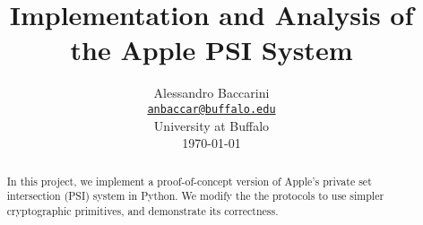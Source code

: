 \documentclass[11pt,letterpaper,oneside]{article}
\title{
Implementation and Analysis of\\ 
 the Apple PSI System \\
 \cite{bhowmick2021apple}
 }
\author{Alessandro Baccarini \\
\small{\href{mailto:anbaccar@buffalo.edu}{\texttt{anbaccar@buffalo.edu}}} \\
\small{University at Buffalo} \\ 
\small{\today} 
 \vspace{-1.5cm}
}
\date{}
\begin{document}
\maketitle


\begin{abstract}
In this project, we implement a proof-of-concept version of Apple's private set intersection (PSI) system in Python. We modify the the protocols to use simpler cryptographic primitives, and demonstrate its correctness.
\end{abstract}







% 



% 



% 
\end{document}

